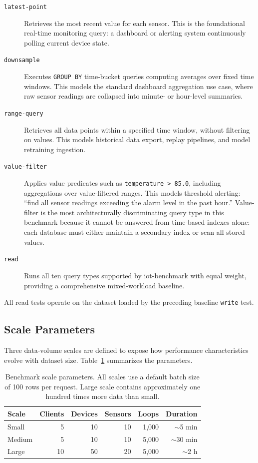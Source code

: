 \begin{description}
  \item[\texttt{latest-point}] Retrieves the most recent value for each sensor. This is
    the foundational real-time monitoring query: a dashboard or alerting system continuously
    polling current device state.

  \item[\texttt{downsample}] Executes \texttt{GROUP~BY} time-bucket queries computing
    averages over fixed time windows. This models the standard dashboard aggregation use case,
    where raw sensor readings are collapsed into minute- or hour-level summaries.

  \item[\texttt{range-query}] Retrieves all data points within a specified time window,
    without filtering on values. This models historical data export, replay pipelines, and
    model retraining ingestion.

  \item[\texttt{value-filter}] Applies value predicates such as \texttt{temperature~>~85.0},
    including aggregations over value-filtered ranges. This models threshold alerting:
    ``find all sensor readings exceeding the alarm level in the past hour.'' Value-filter is
    the most architecturally discriminating query type in this benchmark because it cannot be
    answered from time-based indexes alone: each database must either maintain a secondary
    index or scan all stored values.

  \item[\texttt{read}] Runs all ten query types supported by iot-benchmark with equal weight,
    providing a comprehensive mixed-workload baseline.
\end{description}

All read tests operate on the dataset loaded by the preceding baseline \texttt{write} test.

\subsection{Scale Parameters}
\label{sec:scale-params}

Three data-volume scales are defined to expose how performance characteristics evolve with
dataset size. Table~\ref{tab:scales} summarizes the parameters.

\begin{table}[t]
  \centering
  \caption{Benchmark scale parameters. All scales use a default batch size of 100 rows per
  request. Large scale contains approximately one hundred times more data than small.}
  \label{tab:scales}
  \begin{tabular}{lrrrrr}
    \hline
    \textbf{Scale} & \textbf{Clients} & \textbf{Devices} & \textbf{Sensors} & \textbf{Loops} & \textbf{Duration} \\
    \hline
    Small  &  5 & 10 & 10 & 1{,}000 & ${\sim}$5 min \\
    Medium &  5 & 10 & 10 & 5{,}000 & ${\sim}$30 min \\
    Large  & 10 & 50 & 20 & 5{,}000 & ${\sim}$2 h \\
    \hline
  \end{tabular}
\end{table}

